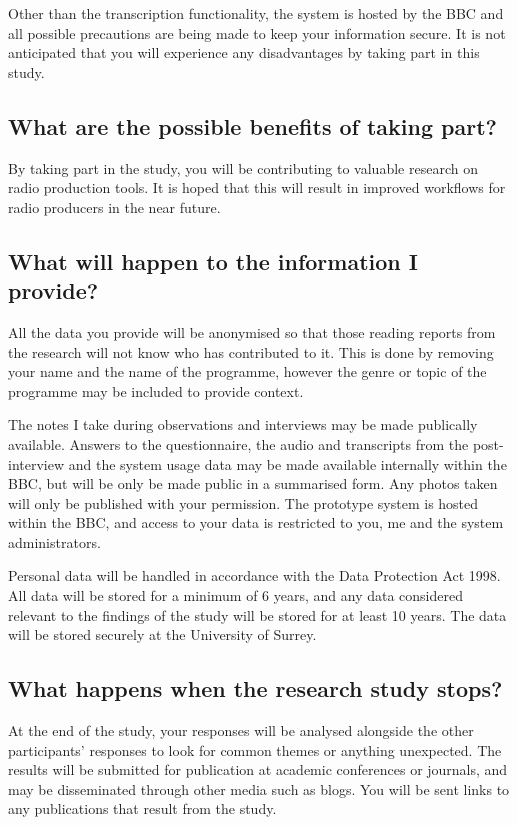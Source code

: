 Other than the transcription functionality, the system is hosted by the BBC and
all possible precautions are being made to keep your information secure. It is
not anticipated that you will experience any disadvantages by taking part in
this study.

\subsection{What are the possible benefits of taking part?}
By taking part in the study, you will be contributing to valuable research on
radio production tools. It is hoped that this will result in improved workflows
for radio producers in the near future.

\subsection{What will happen to the information I provide?}
All the data you provide will be anonymised so that those reading reports from
the research will not know who has contributed to it. This is done by removing
your name and the name of the programme, however the genre or topic of the
programme may be included to provide context.

The notes I take during observations and interviews may be made publically
available. Answers to the questionnaire, the audio and transcripts from the
post-interview and the system usage data may be made available internally
within the BBC, but will be only be made public in a summarised form. Any
photos taken will only be published with your permission. The prototype system
is hosted within the BBC, and access to your data is restricted to you, me and
the system administrators.

Personal data will be handled in accordance with the Data Protection Act 1998.
All data will be stored for a minimum of 6 years, and any data considered
relevant to the findings of the study will be stored for at least 10 years. The
data will be stored securely at the University of Surrey.

\subsection{What happens when the research study stops?}
At the end of the study, your responses will be analysed alongside the other
participants’ responses to look for common themes or anything unexpected. The
results will be submitted for publication at academic conferences or journals,
and may be disseminated through other media such as blogs. You will be sent
links to any publications that result from the study.

